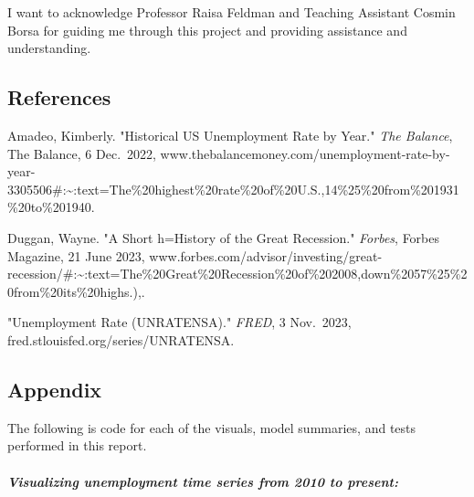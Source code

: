 \documentclass[
  letterpaper,
  DIV=11,
  numbers=noendperiod]{scrartcl}
\let\oldsubparagraph\subparagraph
\renewcommand{\subparagraph}[1]{\oldsubparagraph{#1}\mbox{}}
\begin{document}
I want to acknowledge Professor Raisa Feldman and Teaching Assistant
Cosmin Borsa for guiding me through this project and providing
assistance and understanding.

\hypertarget{references}{%
\subsection{References}\label{references}}

Amadeo, Kimberly. "Historical US Unemployment Rate by Year." \emph{The
Balance}, The Balance, 6 Dec.~2022,
www.thebalancemoney.com/unemployment-rate-by-year-3305506\#:\textasciitilde:text=The\%20highest\%20rate\%20of\%20U.S.,14\%25\%20from\%201931\%20to\%201940.

Duggan, Wayne. "A Short h=History of the Great Recession."
\emph{Forbes}, Forbes Magazine, 21 June 2023,
www.forbes.com/advisor/investing/great-recession/\#:\textasciitilde:text=The\%20Great\%20Recession\%20of\%202008,down\%2057\%25\%20from\%20its\%20highs.),.

"Unemployment Rate (UNRATENSA)." \emph{FRED}, 3 Nov.~2023,
fred.stlouisfed.org/series/UNRATENSA.

\hypertarget{appendix}{%
\subsection{Appendix}\label{appendix}}

The following is code for each of the visuals, model summaries, and
tests performed in this report.

\hypertarget{visualizing-unemployment-time-series-from-2010-to-present}{%
\subparagraph{Visualizing unemployment time series from 2010 to
present:}\label{visualizing-unemployment-time-series-from-2010-to-present}}
\end{document}
